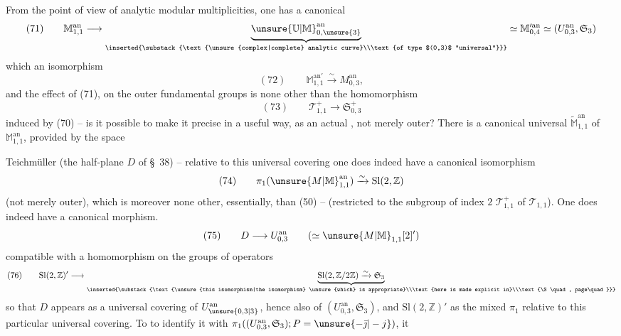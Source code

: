 From the point of view of analytic modular multiplicities, one has a canonical 
\[
(71)\qquad \mathbb M^{\mathrm{an}}_{1,1}\longrightarrow
\underbrace{\unsure{\mathbb U|\mathbb M}^{\mathrm{an}}_{0,\unsure{3}}}_{\inserted{\substack{\text{\unsure{complex|complete} analytic curve}\\\text{of type $(0,3)$ ``universal''}}}}
\simeq \mathbb M^{\prime\mathrm{an}}_{0,4}\simeq(U^{\mathrm{an}}_{0,3},\mathfrak S_3)
\]
 which  an isomorphism
\[
(72)\qquad \mathbb M^{\mathrm{an}\prime}_{1,1}\xrightarrow{\sim} M^{\mathrm{an}}_{0,3},
\]
and the effect of (71), on the outer fundamental groups is none other than the  homomorphism
\[
(73)\qquad \mathcal T^+_{1,1}\longrightarrow\mathfrak S^+_{0,3}
\]
induced by (70) -- is it possible to make it precise in a useful way, as an actual , not merely outer? There is a canonical universal  $\widetilde{\mathbb M}^{\mathrm{an}}_{1,1}$ of $\mathbb M^{\mathrm{an}}_{1,1}$, provided by the space 


Teichmüller (the  half-plane $D$ of \S\ 38) -- relative to this universal covering one does indeed have a canonical isomorphism
\[
(74)\qquad \pi_1(\unsure{M|\mathbb M}^{\mathrm{an}}_{1,1})\xrightarrow{\sim}\mathrm{Sl}(2,\mathbb Z)
\]
(not merely outer), which is moreover none other, essentially, than (50) -- (restricted to the subgroup of index $2$ $\mathcal T^+_{1,1}$ of $\mathcal T_{1,1}$). One does indeed have a canonical morphism.
\[
(75)\qquad D\longrightarrow U^{\mathrm{an}}_{0,3}\qquad(\simeq \unsure{M|\mathbb M}_{1,1}[2]')
\]
compatible with a homomorphism on the groups of operators
\[
(76)\qquad \mathrm{Sl}(2,\mathbb Z)'\longrightarrow
\underbrace{\mathrm{Sl}(2,\mathbb Z/2\mathbb Z)\xrightarrow{\sim}\mathfrak S_3}_{\inserted{\substack{\text{\unsure{this isomorphism|the isomorphism} \unsure{which} is appropriate}\\\text{here is made explicit in}\\\text{\S\quad, page\quad}}}}
\]
so that $D$ appears as a universal covering of $U^{\mathrm{an}}_{\unsure{0,3|3}}$, hence also of $(U^{\mathrm{an}}_{0,3},\mathfrak S_3)$, and $\mathrm{Sl}(2,\mathbb Z)'$ as the mixed $\pi_1$ relative to this particular universal covering. To  to identify it with $\pi_1((U^{\mathrm{an}}_{0,3},\mathfrak S_3);P=\unsure{-\bar{\jmath}|-j})$, it
